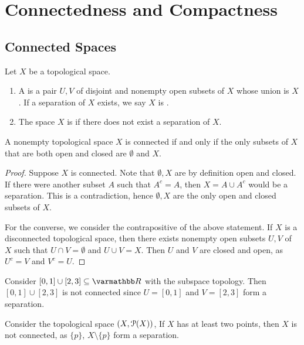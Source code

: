 \chapter{Connectedness and Compactness}

\section{Connected Spaces}

\begin{definition}
    Let $X$ be a topological space.
    \begin{enumerate}[label = (\arabic*),itemsep=1pt,topsep=3pt]
        \item A  is a pair $U,V$ of disjoint and nonempty open subsets of $X$ whose union is $X$. If a separation of $X$ exists, we say $X$ is .
        \item The space $X$ is  if there does not exist a separation of $X$. 
    \end{enumerate}
\end{definition}

\begin{proposition}
    A nonempty topological space $X$ is connected if and only if the only subsets of $X$ that are both open and closed are $\emptyset$ and $X$.
\end{proposition}
    \begin{proof}
        Suppose $X$ is connected. Note that $\emptyset,X$ are by definition open and closed. If there were another subset $A$ such that $A^c = A$, then $X = A \cup A^c$ would be a separation. This is a contradiction, hence $\emptyset,X$ are the only open and closed subsets of $X$.

        For the converse, we consider the contrapositive of the above statement. If $X$ is a disconnected topological space, then there exists nonempty open subsets $U,V$ of $X$ such that $U \cap V = \emptyset$ and $U \cup V = X$. Then $U$ and $V$ are closed and open, as $U^c = V$ and $V^c = U$.
    \end{proof}

\begin{example}
    Consider $[0,1] \cup [2,3] \subseteq \bfR$ with the subspace topology. Then $[0,1] \cup [2,3]$ is not connected since $U = [0,1]$ and $V = [2,3]$ form a separation.
\end{example}

\begin{example}
    Consider the topological space $(X,\mathcal{P}(X))$, If $X$ has at least two points, then $X$ is not connected, as $\{p\}$, $X \setminus \{p\}$ form a separation.
\end{example}

